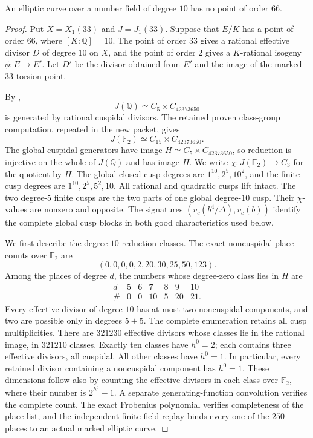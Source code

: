 \begin{proposition}\label{prop:decic66-exclusion}
An elliptic curve over a number field of degree $10$ has no point of order $66$.
\end{proposition}
\begin{proof}
Put $X=X_1(33)$ and $J=J_1(33)$.
Suppose that $E/K$ has a point of order $66$, where $[K:\mathbb Q]=10$.
The point of order $33$ gives a rational effective divisor $D$ of degree
$10$ on $X$, and the point of order $2$ gives a $K$-rational isogeny
$\phi:E\to E'$. Let $D'$ be the divisor obtained from $E'$ and the image
of the marked $33$-torsion point.

By \cite[Theorem~3.1(2), Theorem~4.13 and Table~2]{DEHMZ},
\[
 J(\mathbb Q)\simeq C_5\times C_{42373650}
\]
is generated by rational cuspidal divisors.
The retained proven class-group computation, repeated in the new
packet, gives
\[
 J(\mathbb F_2)\simeq C_{15}\times C_{42373650}.
\]
The global cuspidal generators have image
$H\simeq C_5\times C_{42373650}$, so reduction is injective on the
whole of $J(\mathbb Q)$ and has image $H$.
We write $\chi:J(\mathbb F_2)\to C_3$ for the quotient by $H$.
The global closed cusp degrees are $1^{10},2^5,10^2$, and the finite
cusp degrees are $1^{10},2^5,5^2,10$. All rational and quadratic
cusps lift intact. The two degree-$5$ finite cusps are the two parts
of one global degree-$10$ cusp. Their $\chi$-values are nonzero and
opposite. The signatures $(v_c(b^4/\Delta),v_c(b))$ identify the
complete global cusp blocks in both good characteristics used below.

We first describe the degree-$10$ reduction classes.
The exact noncuspidal place counts over $\mathbb F_2$ are
\[
 (0,0,0,0,2,20,30,25,50,123).
\]
Among the places of degree $d$, the numbers whose degree-zero class
lies in $H$ are
\[
\begin{array}{c|rrrrrr}
 d&5&6&7&8&9&10\\\hline
 \#&0&0&10&5&20&21.
\end{array}
\]
Every effective divisor of degree $10$ has at most two noncuspidal
components, and two are possible only in degrees $5+5$.
The complete enumeration retains all cusp multiplicities.
There are $321230$ effective divisors whose classes lie in the rational
image, in $321210$ classes. Exactly ten classes have $h^0=2$;
each contains three effective divisors, all cuspidal. All other
classes have $h^0=1$. In particular, every retained divisor containing
a noncuspidal component has $h^0=1$.
These dimensions follow also by counting the effective divisors in
each class over $\mathbb F_2$, where their number is $2^{h^0}-1$.
A separate generating-function convolution verifies the complete count.
The exact Frobenius polynomial verifies completeness of the place
list, and the independent finite-field replay binds every one of the
$250$ places to an actual marked elliptic curve.


\end{proof}
